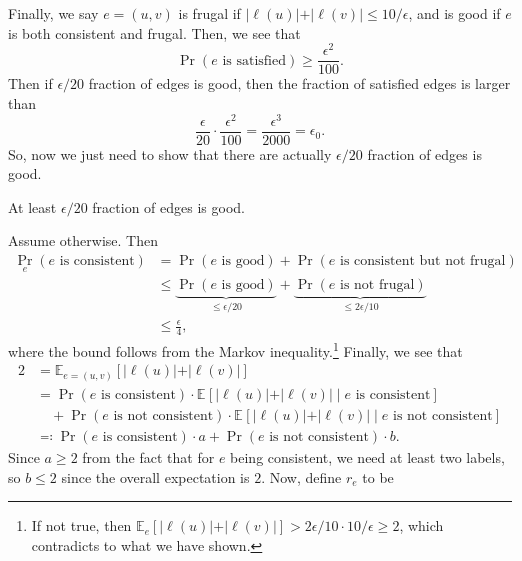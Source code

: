 \begin{enumerate}[(a)]
	      Finally, we say \(e=(u, v)\) is frugal if \(\vert \ell (u) \vert + \vert \ell (v) \vert \leq 10 / \epsilon \), and is good if \(e\) is both consistent and frugal. Then, we see that
	      \[
		      \Pr_{}(e\text{ is satisfied}) \geq \frac{\epsilon ^{2} }{100}.
	      \]
	      Then if \(\epsilon / 20\) fraction of edges is good, then the fraction of satisfied edges is larger than
	      \[
		      \frac{\epsilon}{20}\cdot \frac{\epsilon ^{2} }{100} = \frac{\epsilon ^3}{2000} = \epsilon _0.
	      \]
	      So, now we just need to show that there are actually \(\epsilon / 20\) fraction of edges is good.
	      \begin{claim}
		      At least \(\epsilon / 20\) fraction of edges is good.
	      \end{claim}
	      \begin{explanation}
		      Assume otherwise. Then
		      \[
			      \begin{split}
				      \Pr_{e}(e\text{ is consistent})
				      &= \Pr_{}(e\text{ is good}) + \Pr_{}(e\text{ is consistent but not frugal} )\\
				      &\leq \underbrace{\Pr_{}(e\text{ is good})}_{\leq \epsilon / 20} + \underbrace{\Pr_{}(e\text{ is not frugal} )}_{\leq 2\epsilon / 10}\\
				      &\leq \frac{\epsilon}{4},
			      \end{split}
		      \]
		      where the bound follows from the Markov inequality.\footnote{If not true, then \(\mathbb{E}_{e}\left[\vert \ell (u) \vert + \vert \ell (v) \vert \right] > 2\epsilon / 10 \cdot 10 / \epsilon \geq 2\), which contradicts to what we have shown.} Finally, we see that
		      \[
			      \begin{split}
				      2&= \mathbb{E}_{e=(u, v)}\left[\vert \ell (u) \vert + \vert \ell (v) \vert  \right] \\
				      &= \Pr_{}(e\text{ is consistent} ) \cdot \mathbb{E}_{}\left[\vert \ell (u) \vert + \vert \ell (v) \vert \mid e\text{ is consistent}  \right] \\
				      &\quad + \Pr_{}(e\text{ is not consistent} ) \cdot \mathbb{E}_{}\left[\vert \ell (u) \vert + \vert \ell (v) \vert \mid e\text{ is not consistent}  \right] \\
				      &\eqqcolon \Pr_{}(e\text{ is consistent} ) \cdot a + \Pr_{}(e\text{ is not consistent} ) \cdot b.
			      \end{split}
		      \]
		      Since \(a \geq 2\) from the fact that for \(e\) being consistent, we need at least two labels, so \(b \leq 2\) since the overall expectation is \(2\). Now, define \(r_e\) to be

\end{explanation}
\end{enumerate}
